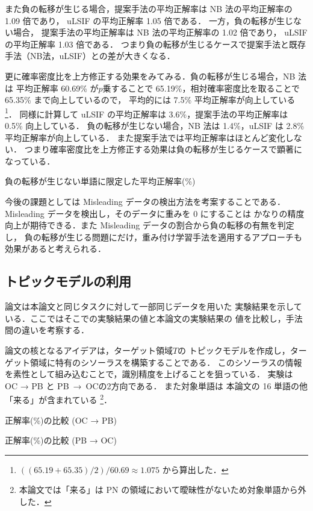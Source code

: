 \documentclass[japanese]{jnlp_1.4}
\begin{document}
また負の転移が生じる場合，提案手法の平均正解率は NB 法の平均正解率の 1.09 倍であり，
uLSIF の平均正解率 1.05 倍である．
一方，負の転移が生じない場合，
提案手法の平均正解率は NB 法の平均正解率の 1.02 倍であり，
uLSIF の平均正解率 1.03 倍である．
つまり負の転移が生じるケースで提案手法と既存手法（NB法，uLSIF）との差が大きくなる．

更に確率密度比を上方修正する効果をみてみる．負の転移が生じる場合，NB 法は 
平均正解率 60.69\% が$p$乗することで  65.19\%，相対確率密度比を取ることで 65.35\% まで向上しているので，
平均的には 7.5\% 平均正解率が向上している
\footnote{$((65.19 + 65.35)/2)/60.69 \approx 1.075$ から算出した．}．
同様に計算して uLSIF の平均正解率は 3.6\%，提案手法の平均正解率は 0.5\% 向上している．
負の転移が生じない場合，NB 法は 1.4\%，uLSIF は 2.8\% 平均正解率が向上している．
また提案手法では平均正解率はほとんど変化しない．
つまり確率密度比を上方修正する効果は負の転移が生じるケースで顕著になっている．

\begin{table}[t]
\caption{負の転移が生じない単語に限定した平均正解率(\%)}
\label{tab:del-fu-kekka2}

\end{table}

今後の課題としては Misleading データの検出方法を考案することである．
Misleading データを検出し，そのデータに重みを 0 にすることは
かなりの精度向上が期待できる．また Misleading データの割合から負の転移の有無を判定し，
負の転移が生じる問題にだけ，重み付け学習手法を適用するアプローチも効果があると考えられる．


\subsection{トピックモデルの利用}

論文\cite{shinnou-gengo-13}は本論文と同じタスクに対して一部同じデータを用いた
実験結果を示している．ここではそこでの実験結果の値と本論文の実験結果の
値を比較し，手法間の違いを考察する．

論文\cite{shinnou-gengo-13}の核となるアイデアは，ターゲット領域$T$の
トピックモデルを作成し，ターゲット領域に特有のシソーラスを構築することである．
このシソーラスの情報を素性として組み込むことで，識別精度を上げることを狙っている．
実験は OC → PB と
\mbox{PB → OC}の2方向である． また対象単語は
本論文の 16 単語の他「来る」が含まれている
\footnote{本論文では「来る」は PN の領域において曖昧性がないため対象単語から外した．}．

\begin{table}[p]
\caption{正解率(\%)の比較 (OC → PB)}
\label{tm-hikaku1}

\end{table}
\begin{table}[p]
\caption{正解率(\%)の比較 (PB → OC)}
\label{tm-hikaku2}

\end{table}
\end{document}
